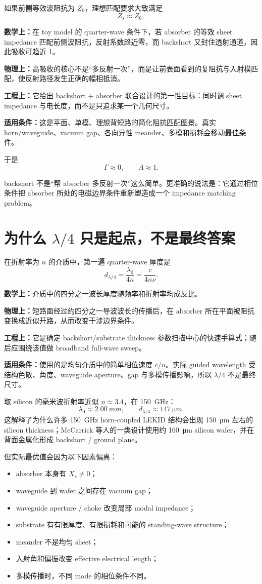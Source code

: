 \documentclass[11pt,a4paper,openany]{ctexrep}
\newcommand{\formulaexplain}[4]{%
\begin{formulaguidebox}
\textbf{\color{KidBlue}数学上：}#1\par
\textbf{\color{KidTeal}物理上：}#2\par
\textbf{\color{KidGold!55!black}工程上：}#3\par
\textbf{\color{KidRed}适用条件：}#4
\end{formulaguidebox}%
}
\begin{document}
如果前侧等效波阻抗为 $Z_0$，理想匹配要求大致满足
\[
\boxed{Z_s\approx Z_0,}
\]
\formulaexplain
{在 toy model 的 quarter-wave 条件下，若 absorber 的等效 sheet impedance 匹配前侧波阻抗，反射系数趋近零，而 backshort 又封住透射通道，因此吸收可趋近 1。}
{高吸收的核心不是“多反射一次”，而是让前表面看到的复阻抗与入射模匹配，使反射路径发生正确的幅相抵消。}
{它给出 backshort + absorber 联合设计的第一性目标：同时调 sheet impedance 与电长度，而不是只追求某一个几何尺寸。}
{这是平面、单模、理想背短路的简化阻抗匹配图景。真实 horn/waveguide、vacuum gap、各向异性 meander、多模和损耗会移动最佳条件。}
于是
\[
\Gamma\approx0,\qquad A\approx1.
\]

\begin{intuitionbox}
backshort 不是“帮 absorber 多反射一次”这么简单。更准确的说法是：它通过相位条件把 absorber 所处的电磁边界条件重新塑造成一个 impedance matching problem。
\end{intuitionbox}

\section{为什么 $\lambda/4$ 只是起点，不是最终答案}

在折射率为 $n$ 的介质中，第一遍 quarter-wave 厚度是
\[
d_{\lambda/4}=\frac{\lambda_0}{4n}=\frac{c}{4n\nu}.
\]
\formulaexplain
{介质中的四分之一波长厚度随频率和折射率均成反比。}
{短路面经过约四分之一导波波长的传播后，在 absorber 所在平面被阻抗变换成近似开路，从而改变干涉边界条件。}
{它是确定 backshort/substrate thickness 参数扫描中心的快速手算式；随后应围绕该值做 broadband full-wave sweep。}
{使用的是均匀介质中的简单相位速度 $c/n$。实际 guided wavelength 受结构色散、角度、waveguide aperture、gap 与多模传播影响，所以 $\lambda/4$ 不是最终尺寸。}
取 silicon 的毫米波折射率近似 $n\approx3.4$，在 \SI{150}{GHz}：
\[
\lambda_0\approx\SI{2.00}{mm},
\qquad
d_{\lambda/4}\approx\SI{147}{\micro m}.
\]
这解释了为什么许多 \SI{150}{GHz} horn-coupled LEKID 结构会出现 \SI{150}{\micro m} 左右的 silicon thickness；McCarrick 等人的一类设计使用约 \SI{160}{\micro m} silicon wafer，并在背面金属化形成 backshort / ground plane。

但实际最优值会因为以下因素偏离：
\begin{itemize}
  \item absorber 本身有 $X_s\neq0$；
  \item waveguide 到 wafer 之间存在 vacuum gap；
  \item waveguide aperture / choke 改变局部 modal impedance；
  \item substrate 有有限厚度、有限损耗和可能的 standing-wave structure；
  \item meander 不是均匀 sheet；
  \item 入射角和偏振改变 effective electrical length；
  \item 多模传播时，不同 mode 的相位条件不同。
\end{itemize}
\end{document}
